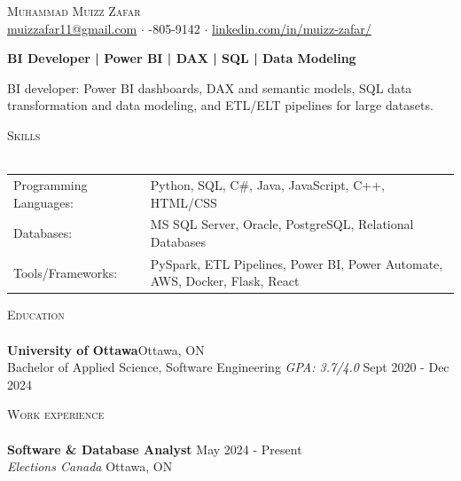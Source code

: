 \documentclass[a4paper]{article}
\newcommand{\lineunder} {
    \vspace*{-8pt} \\
    \hspace*{-18pt} \hrulefill \\
}
\newcommand{\header} [1] {
    {\hspace*{-18pt}\vspace*{6pt} \textsc{#1}}
    \vspace*{-6pt} \lineunder
}
\begin{document}
\vspace*{-40pt}
\vspace*{-10pt}
\begin{center}
	{\Huge \scshape {Muhammad Muizz Zafar}}\\
	\faSend \space \href{mailto:muizzafar11@gmail.com}{muizzafar11@gmail.com} $\cdot$ \faPhoneSquare {}-805-9142 $\cdot$ \faLinkedinSquare \space \href{https://www.linkedin.com/in/muizz-zafar/}{linkedin.com/in/muizz-zafar/}
	\\
\end{center}
\vspace{-5pt}
\begin{center}
\textbf{BI Developer | Power BI | DAX | SQL | Data Modeling}
\end{center}
\begin{center}
BI developer: Power BI dashboards, DAX and semantic models, SQL data transformation and data modeling, and ETL/ELT pipelines for large datasets.
\end{center}
\header{Skills}
\begin{tabular}{ l l }
	Programming Languages:        & Python, SQL, C\#, Java, JavaScript, C++, HTML/CSS \\
	Databases:                    & MS SQL Server, Oracle, PostgreSQL, Relational Databases \\
	Tools/Frameworks:             & PySpark, ETL Pipelines, Power BI, Power Automate, AWS, Docker, Flask, React \\
\end{tabular}
\vspace{2mm}
\header{Education}
\textbf{University of Ottawa}\hfill Ottawa, ON\\
Bachelor of Applied Science, Software Engineering \textit{GPA: 3.7/4.0} \hfill Sept 2020 - Dec 2024\\
\vspace{2mm}
\header{Work experience}
\vspace{1.5mm}
\textbf{Software \& Database Analyst} \hfill May 2024 - Present\\
\textit{Elections Canada} \hfill Ottawa, ON\\
\vspace{-2mm}
\end{document}
